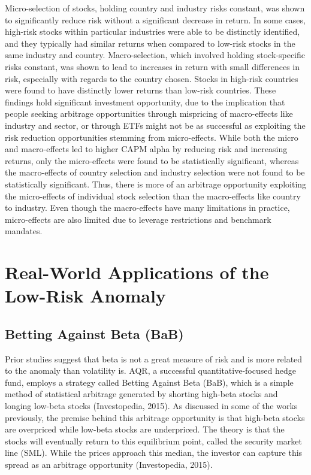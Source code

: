 \documentclass[12pt,twoside]{reedthesis}
\theoremstyle{definition}
\theoremstyle{definition}
\theoremstyle{definition}
\theoremstyle{remark}
\begin{document}
Micro-selection of stocks, holding country and industry risks constant,
was shown to significantly reduce risk without a significant decrease in
return. In some cases, high-risk stocks within particular industries
were able to be distinctly identified, and they typically had similar
returns when compared to low-risk stocks in the same industry and
country. Macro-selection, which involved holding stock-specific risks
constant, was shown to lead to increases in return with small
differences in risk, especially with regards to the country chosen.
Stocks in high-risk countries were found to have distinctly lower
returns than low-risk countries. These findings hold significant
investment opportunity, due to the implication that people seeking
arbitrage opportunities through mispricing of macro-effects like
industry and sector, or through ETFs might not be as successful as
exploiting the risk reduction opportunities stemming from micro-effects.
While both the micro and macro-effects led to higher CAPM alpha by
reducing risk and increasing returns, only the micro-effects were found
to be statistically significant, whereas the macro-effects of country
selection and industry selection were not found to be statistically
significant. Thus, there is more of an arbitrage opportunity exploiting
the micro-effects of individual stock selection than the macro-effects
like country to industry. Even though the macro-effects have many
limitations in practice, micro-effects are also limited due to leverage
restrictions and benchmark mandates.

\section{Real-World Applications of the Low-Risk
Anomaly}\label{real-world-applications-of-the-low-risk-anomaly}

\subsection{Betting Against Beta (BaB)}\label{betting-against-beta-bab}

Prior studies suggest that beta is not a great measure of risk and is
more related to the anomaly than volatility is. AQR, a successful
quantitative-focused hedge fund, employs a strategy called Betting
Against Beta (BaB), which is a simple method of statistical arbitrage
generated by shorting high-beta stocks and longing low-beta stocks
(Investopedia, 2015). As discussed in some of the works previously, the
premise behind this arbitrage opportunity is that high-beta stocks are
overpriced while low-beta stocks are underpriced. The theory is that the
stocks will eventually return to this equilibrium point, called the
security market line (SML). While the prices approach this median, the
investor can capture this spread as an arbitrage opportunity
(Investopedia, 2015).
\end{document}
